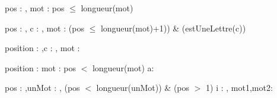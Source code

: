 \begin{algorithme}
       {pos : \entier, mot : \Mot}%
       {\Mot}%
       {pos $\leq$ longueur(mot)}%
       { %
             {
             }
            
        }
\end{algorithme}


\begin{algorithme}
       {pos : \entier, c : \caractere, mot : \Mot}%
       {\Mot}%
       {(pos $\leq$ longueur(mot)+1)) \land \& (estUneLettre(c))}%
       {
                {
                }
       
       }
          
\end{algorithme}


\begin{algorithme}%
       {position : \entier,c : \caractere, mot : \Mot}%
       {\Mot}%
       {
       
       }
\end{algorithme}


\begin{algorithme}%
      {position : \entier}%
      {mot : \Mot}%
      {pos $<$ longueur(mot)}%
      {a: \caractere }%
      {
         
      }
\end{algorithme}


\begin{algorithme}
         {pos : \entier,unMot : \Mot}%
         {\Mot, \Mot}%
         {(pos $<$ longueur(unMot)) \land \& (pos $>$ 1)}%
         {i : \entier, mot1,mot2: \Mot}%
         {
                {
                }
                {
                }
          }
\end{algorithme}
     


    

     



  

       




 

